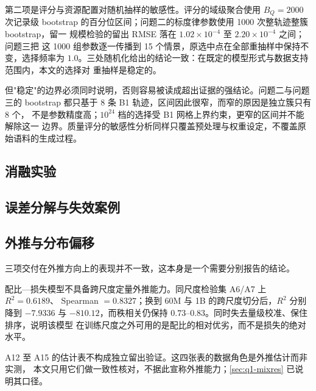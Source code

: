 \documentclass[bwprint]{gmcmthesis}
\numberwithin{equation}{section}
\numberwithin{figure}{section}
\numberwithin{table}{section}
\begin{document}
第二项是评分与资源配置对随机抽样的敏感性。评分的域级聚合使用 $B_Q=2000$ 次记录级
bootstrap 的百分位区间；问题二的标度律参数使用 1000 次整轨迹整簇 bootstrap，留一
规模检验的留出 RMSE 落在 $1.02\times10^{-4}$ 至 $2.20\times10^{-4}$ 之间；问题三把
这 1000 组参数逐一传播到 15 个情景，原选中点在全部重抽样中保持不变，选择频率为
$1.0$。三处随机化给出的结论一致：在既定的模型形式与数据支持范围内，本文的选择对
重抽样是稳定的。

但"稳定"的边界必须同时说明，否则容易被读成超出证据的强结论。问题二与问题三的
bootstrap 都只基于 8 条 B1 轨迹，区间因此很窄，而窄的原因是独立簇只有 8 个，
不是参数精度高；$10^{24}$ 档的选择受 B1 网格上界约束，更窄的区间并不能解除这一
边界。质量评分的敏感性分析同样只覆盖预处理与权重设定，不覆盖原始语料的生成过程。

\subsection{消融实验}


\subsection{误差分解与失效案例}


\subsection{外推与分布偏移}

三项交付在外推方向上的表现并不一致，这本身是一个需要分别报告的结论。

配比—损失模型不具备跨尺度定量外推能力。同尺度检验集 A6/A7 上 $R^2=0.6189$、
Spearman $=0.8327$；换到 60M 与 1B 的跨尺度切分后，$R^2$ 分别降到 $-7.9336$ 与
$-810.12$，而秩相关仍保持 $0.73$--$0.83$。同时失去量级校准、保住排序，说明该模型
在训练尺度之外可用的是配比的相对优劣，而不是损失的绝对水平。

A12 至 A15 的估计表不构成独立留出验证。这四张表的数据角色是外推估计而非实测，
本文只用它们做一致性核对，不据此宣称外推能力；\ref{sec:q1-mixres} 已说明其口径。
\end{document}

